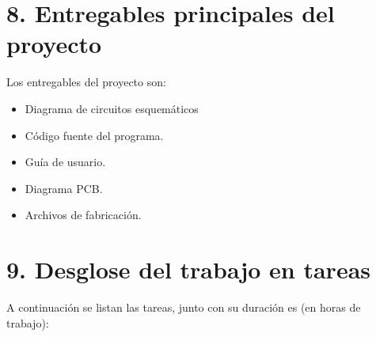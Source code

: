 \documentclass[
11pt, %
codirector, %
]{charter}
\begin{document}
\section{8. Entregables principales del proyecto}
\label{sec:entregables}


Los entregables del proyecto son:

\begin{itemize}
	\item Diagrama de circuitos esquemáticos
	\item Código fuente del programa.
	\item Guía de usuario.
	\item Diagrama PCB.
	\item Archivos de fabricación.
\end{itemize}


\section{9. Desglose del trabajo en tareas}
\label{sec:wbs}

A continuación se listan las tareas, junto con su duración es (en horas de trabajo):
\end{document}

